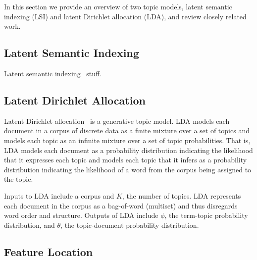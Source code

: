 
In this section we provide an overview of two topic models,
latent semantic indexing (LSI) and latent Dirichlet allocation (LDA),
and review closely related work.

\subsection{Latent Semantic Indexing}

Latent semantic indexing~\cite{Deerwester:1990} stuff.

\subsection{Latent Dirichlet Allocation}

Latent Dirichlet allocation~\cite{Blei-etal:2003} is a generative topic model.
LDA models each document in a corpus of discrete data as a finite mixture over a set of topics
and models each topic as an infinite mixture over a set of topic probabilities.
That is, LDA models each document as a probability distribution
indicating the likelihood that it expresses each topic and
models each topic that it infers as a probability distribution
indicating the likelihood of a word from the corpus being assigned to the topic.

Inputs to LDA include a corpus and $K$, the number of topics.
LDA represents each document in the corpus as a bag-of-word (multiset)
and thus disregards word order and structure.
Outputs of LDA include $\phi$, the term-topic probability distribution,
and $\theta$, the topic-document probability distribution.


\subsection{Feature Location}

